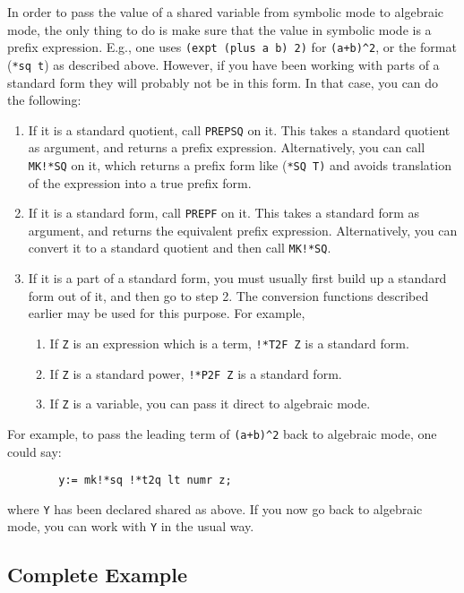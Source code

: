In order to pass the value of a shared variable from symbolic mode to
algebraic mode, the only thing to do is make sure that the value in
symbolic mode is a prefix expression. E.g., one uses
\texttt{(expt (plus a b) 2)} for \texttt{(a+b)\textasciicircum 2}, or the format (\texttt{*sq  t}) as described above.  However, if you have
been working with parts of a standard form they will probably not be in
this form.  In that case, you can do the following:
\begin{enumerate}
\item If it is a standard quotient, call \texttt{PREPSQ} on it.  This takes a
standard quotient as argument, and returns a prefix expression.
Alternatively, you can call \texttt{MK!*SQ} on it, which returns a prefix
form like (\texttt{*SQ  T)} and avoids translation of
the expression into a true prefix form.

\item If it is a standard form, call \texttt{PREPF} on it.  This takes a
standard form as argument, and returns the equivalent prefix expression.
Alternatively, you can convert it to a standard quotient and then call
\texttt{MK!*SQ}.

\item If it is a part of a standard form, you must usually first build up a
standard form out of it, and then go to step 2. The conversion functions
described earlier may be used for this purpose. For example,
\begin{enumerate}
\item If \texttt{Z} is an expression which is a term, \texttt{!*T2F Z} is a
standard form.
\item If \texttt{Z} is a standard power, \texttt{!*P2F Z} is a standard form.
\item If \texttt{Z} is a variable, you can pass it direct to algebraic mode.
\end{enumerate}
\end{enumerate}
For example, to pass the leading term of \texttt{(a+b)\textasciicircum 2} back to
algebraic mode, one could say:
\begin{verbatim}
        y:= mk!*sq !*t2q lt numr z;
\end{verbatim}
where \texttt{Y} has been declared shared as above.  If you now go back to
algebraic mode, you can work with \texttt{Y} in the usual way.


\subsection{Complete Example}

